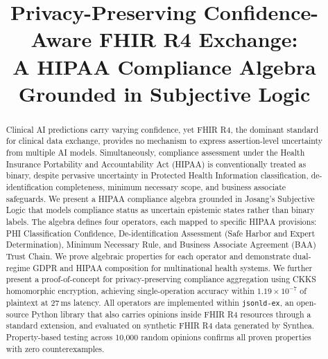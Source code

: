 \documentclass[conference]{IEEEtran}
\begin{document}

\title{Privacy-Preserving Confidence-Aware FHIR R4 Exchange:\\A HIPAA Compliance Algebra Grounded in Subjective Logic}

\author{
\and
{}
\and
{}
}

\maketitle

\begin{abstract}
Clinical AI predictions carry varying confidence, yet FHIR R4, the dominant standard for clinical data exchange, provides no mechanism to express assertion-level uncertainty from multiple AI models. Simultaneously, compliance assessment under the Health Insurance Portability and Accountability Act (HIPAA) is conventionally treated as binary, despite pervasive uncertainty in Protected Health Information classification, de-identification completeness, minimum necessary scope, and business associate safeguards. We present a HIPAA compliance algebra grounded in J{\o}sang's Subjective Logic that models compliance status as uncertain epistemic states rather than binary labels. The algebra defines four operators, each mapped to specific HIPAA provisions: PHI Classification Confidence, De-identification Assessment (Safe Harbor and Expert Determination), Minimum Necessary Rule, and Business Associate Agreement (BAA) Trust Chain. We prove algebraic properties for each operator and demonstrate dual-regime GDPR and HIPAA composition for multinational health systems. We further present a proof-of-concept for privacy-preserving compliance aggregation using CKKS homomorphic encryption, achieving single-operation accuracy within $1.19 \times 10^{-7}$ of plaintext at 27\,ms latency. All operators are implemented within \texttt{jsonld-ex}, an open-source Python library that also carries opinions inside FHIR R4 resources through a standard extension, and evaluated on synthetic FHIR R4 data generated by Synthea. Property-based testing across 10,000 random opinions confirms all proven properties with zero counterexamples.
\end{abstract}
\end{document}
